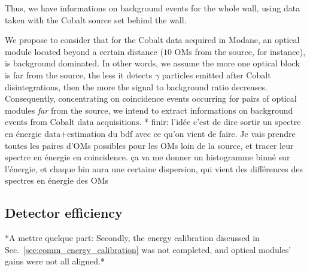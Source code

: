 
Thus, we have informations on background events for the whole wall, using data taken with the Cobalt source set behind the wall.

We propose to consider that for the Cobalt data acquired in Modane, an optical module located beyond a certain distance ($10$ OMs from the source, for instance), is background dominated.
In other words, we assume the more one optical block is far from the source, the less it detects $\gamma$ particles emitted after Cobalt disintegrations, then the more the signal to background ratio decreases.
Consequently, concentrating on coincidence events occurring for pairs of optical modules \emph{far} from the source, we intend to extract informations on background events from Cobalt data acquisitions.
\newline
* finir: l'idée c'est de dire sortir un spectre en énergie data+estimation du bdf avec ce qu'on vient de faire.
Je vais prendre toutes les paires d'OMs possibles pour les OMs loin de la source, et tracer leur spectre en énergie en coincidence.
ça va me donner un histogramme binné sur l'énergie, et chaque bin aura une certaine dispersion, qui vient des différences des spectres en énergie des OMs\\



\subsection{Detector efficiency}
\label{subsec:detector_efficiency}

*A mettre quelque part:
Secondly, the energy calibration discussed in Sec.~\ref{sec:comm_energy_calibration} was not completed, and optical modules' gains were not all aligned.*


